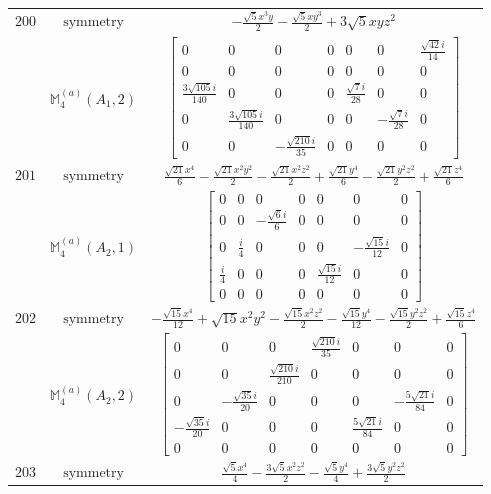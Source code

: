 \documentclass[fleqn,8pt,landscape]{jsarticle}
\begin{document}
\begin{longtable}{ccc}
$ 200 $ & $ \text{symmetry} $ & $ - \frac{\sqrt{5} x^{3} y}{2} - \frac{\sqrt{5} x y^{3}}{2} + 3 \sqrt{5} x y z^{2} $ \\
$  $ & $ \mathbb{M}_{4}^{(a)}(A_{1},2) $ & $ \begin{bmatrix} 0 & 0 & 0 & 0 & 0 & 0 & \frac{\sqrt{42} i}{14} \\ 0 & 0 & 0 & 0 & 0 & 0 & 0 \\ \frac{3 \sqrt{105} i}{140} & 0 & 0 & 0 & \frac{\sqrt{7} i}{28} & 0 & 0 \\ 0 & \frac{3 \sqrt{105} i}{140} & 0 & 0 & 0 & - \frac{\sqrt{7} i}{28} & 0 \\ 0 & 0 & - \frac{\sqrt{210} i}{35} & 0 & 0 & 0 & 0 \end{bmatrix} $ \\ \hline
$ 201 $ & $ \text{symmetry} $ & $ \frac{\sqrt{21} x^{4}}{6} - \frac{\sqrt{21} x^{2} y^{2}}{2} - \frac{\sqrt{21} x^{2} z^{2}}{2} + \frac{\sqrt{21} y^{4}}{6} - \frac{\sqrt{21} y^{2} z^{2}}{2} + \frac{\sqrt{21} z^{4}}{6} $ \\
$  $ & $ \mathbb{M}_{4}^{(a)}(A_{2},1) $ & $ \begin{bmatrix} 0 & 0 & 0 & 0 & 0 & 0 & 0 \\ 0 & 0 & - \frac{\sqrt{6} i}{6} & 0 & 0 & 0 & 0 \\ 0 & \frac{i}{4} & 0 & 0 & 0 & - \frac{\sqrt{15} i}{12} & 0 \\ \frac{i}{4} & 0 & 0 & 0 & \frac{\sqrt{15} i}{12} & 0 & 0 \\ 0 & 0 & 0 & 0 & 0 & 0 & 0 \end{bmatrix} $ \\ \hline
$ 202 $ & $ \text{symmetry} $ & $ - \frac{\sqrt{15} x^{4}}{12} + \sqrt{15} x^{2} y^{2} - \frac{\sqrt{15} x^{2} z^{2}}{2} - \frac{\sqrt{15} y^{4}}{12} - \frac{\sqrt{15} y^{2} z^{2}}{2} + \frac{\sqrt{15} z^{4}}{6} $ \\
$  $ & $ \mathbb{M}_{4}^{(a)}(A_{2},2) $ & $ \begin{bmatrix} 0 & 0 & 0 & \frac{\sqrt{210} i}{35} & 0 & 0 & 0 \\ 0 & 0 & \frac{\sqrt{210} i}{210} & 0 & 0 & 0 & 0 \\ 0 & - \frac{\sqrt{35} i}{20} & 0 & 0 & 0 & - \frac{5 \sqrt{21} i}{84} & 0 \\ - \frac{\sqrt{35} i}{20} & 0 & 0 & 0 & \frac{5 \sqrt{21} i}{84} & 0 & 0 \\ 0 & 0 & 0 & 0 & 0 & 0 & 0 \end{bmatrix} $ \\ \hline
$ 203 $ & $ \text{symmetry} $ & $ \frac{\sqrt{5} x^{4}}{4} - \frac{3 \sqrt{5} x^{2} z^{2}}{2} - \frac{\sqrt{5} y^{4}}{4} + \frac{3 \sqrt{5} y^{2} z^{2}}{2} $ \\

\end{longtable}
\end{document}
